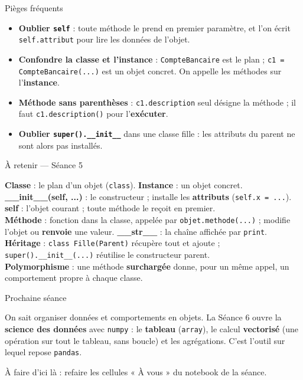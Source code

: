 \documentclass[aspectratio=169,11pt]{beamer}
\begin{document}
\begin{frame}{Pièges fréquents}
\begin{itemize}\small
  \item \textbf{Oublier \texttt{self}} : toute méthode le prend en premier paramètre, et l'on écrit \texttt{self.attribut} pour lire les données de l'objet.
  \item \textbf{Confondre la classe et l'instance} : \texttt{CompteBancaire} est le plan ; \texttt{c1 = CompteBancaire(...)} est un objet concret. On appelle les méthodes sur l'\textbf{instance}.
  \item \textbf{Méthode sans parenthèses} : \texttt{c1.description} seul désigne la méthode ; il faut \texttt{c1.description()} pour l'\textbf{exécuter}.
  \item \textbf{Oublier \texttt{super().\_\_init\_\_}} dans une classe fille : les attributs du parent ne sont alors pas installés.
\end{itemize}
\end{frame}

\begin{frame}{À retenir — Séance 5}
\begin{ucadret}[L'essentiel]
{\small
\textbf{Classe} : le plan d'un objet (\texttt{class}). \textbf{Instance} : un objet concret.\\[2pt]
\textbf{\_\_init\_\_(self, ...)} : le constructeur ; installe les \textbf{attributs} (\texttt{self.x = ...}).\\[2pt]
\textbf{self} : l'objet courant ; toute méthode le reçoit en premier.\\[2pt]
\textbf{Méthode} : fonction dans la classe, appelée par \texttt{objet.methode(...)} ; modifie l'objet ou \textbf{renvoie} une valeur. \textbf{\_\_str\_\_} : la chaîne affichée par \texttt{print}.\\[2pt]
\textbf{Héritage} : \texttt{class Fille(Parent)} récupère tout et ajoute ; \texttt{super().\_\_init\_\_(...)} réutilise le constructeur parent.\\[2pt]
\textbf{Polymorphisme} : une méthode \textbf{surchargée} donne, pour un même appel, un comportement propre à chaque classe.}
\end{ucadret}
\end{frame}

\begin{frame}{Prochaine séance}
\begin{ucaddef}
{\small On sait organiser données et comportements en objets. La Séance 6 ouvre la \textbf{science des données} avec \texttt{numpy} : le \textbf{tableau} (\texttt{array}), le calcul \textbf{vectorisé} (une opération sur tout le tableau, sans boucle) et les agrégations. C'est l'outil sur lequel repose \texttt{pandas}.}
\end{ucaddef}
{\small À faire d'ici là : refaire les cellules « À vous » du notebook de la séance.}
\end{frame}
\end{document}
